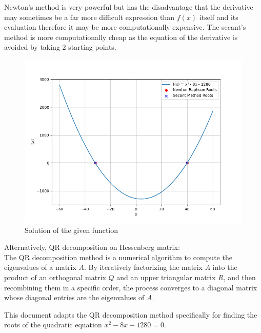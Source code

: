 \documentclass[journal]{IEEEtran}
\begin{document}
Newton's method is very powerful but has the disadvantage that the derivative may sometimes be a far more difficult expression than \(f(x)\) itself and its evaluation therefore it may be more computationally expensive. The secant's method is more computationally cheap as the equation of the derivative is avoided by taking 2 starting points.\\ 
\begin{figure}[H]
		\centering
		\includegraphics[width=\columnwidth]{figs/Figure_1.png}
		\caption{Solution of the given function}
		\label{stemplot}
	\end{figure}

Alternatively, QR decomposition on Hessenberg matrix:\\
The QR decomposition method is a numerical algorithm to compute the eigenvalues of a matrix \( A \). By iteratively factorizing the matrix \( A \) into the product of an orthogonal matrix \( Q \) and an upper triangular matrix \( R \), and then recombining them in a specific order, the process converges to a diagonal matrix whose diagonal entries are the eigenvalues of \( A \).

This document adapts the QR decomposition method specifically for finding the roots of the quadratic equation \( x^2 - 8x - 1280 = 0 \).
\end{document}
